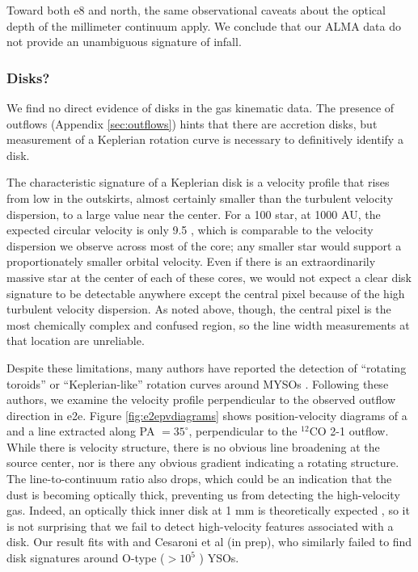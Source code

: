 \documentclass{emulateapj}
\begin{document}


Toward both e8 and north, the same observational caveats about the optical
depth of the millimeter continuum apply.  We conclude that  our  ALMA data do
not provide an unambiguous signature of infall.

\subsubsection{Disks?}
\label{sec:disks}
We find no direct evidence of disks in the gas kinematic data.  The presence of
outflows (Appendix \ref{sec:outflows}) hints that there are accretion disks,
but measurement of a Keplerian rotation curve is necessary to definitively
identify a disk.

The characteristic signature of a Keplerian disk is a velocity profile that
rises from low in the outskirts, almost certainly smaller than the turbulent
velocity dispersion, to a large value near the center.  For a 100 \msun star,
at 1000 AU, the expected circular velocity is only 9.5 \kms, which is comparable
to the velocity dispersion we observe across most of the core; any smaller
star would support a proportionately smaller orbital velocity.  Even if there
is an extraordinarily massive star at the center of each of these cores, we
would not expect a clear disk signature to be detectable anywhere except the
central pixel because of the high turbulent velocity dispersion.  As noted
above, though, the central pixel is the most chemically complex and confused
region, so the line width measurements at that location are unreliable.

Despite these limitations, many authors have reported the detection of
``rotating toroids'' or ``Keplerian-like'' rotation curves around MYSOs
\citep{Johnston2015a,Chen2016b,Ilee2016a,Zapata2015a,Hunter2014a,Sanchez-Monge2013a,Moscadelli2014a}.
Following these authors, we examine the velocity profile perpendicular to the
observed outflow direction in e2e.  Figure \ref{fig:e2epvdiagrams} shows
position-velocity diagrams of a \methanol and a \methylformate line extracted
along PA $=35^\circ$, perpendicular to the $^{12}$CO 2-1 outflow.
While there
is velocity structure, there is no obvious line broadening at the source
center, nor is there any obvious gradient indicating a rotating structure.  The
line-to-continuum ratio also drops, which could be an indication that the dust
is becoming optically thick, preventing us from detecting the
high-velocity gas.  Indeed, an optically thick inner disk at 1 mm is theoretically
expected \citep{Forgan2016a,Klassen2016a}, so it is not surprising that we fail
to detect high-velocity features associated with a disk.  Our result fits with
\citet{Maud2017a} and Cesaroni et al (in prep), who similarly failed to find
disk signatures around O-type ($>10^5$ \lsun) YSOs.
\end{document}
